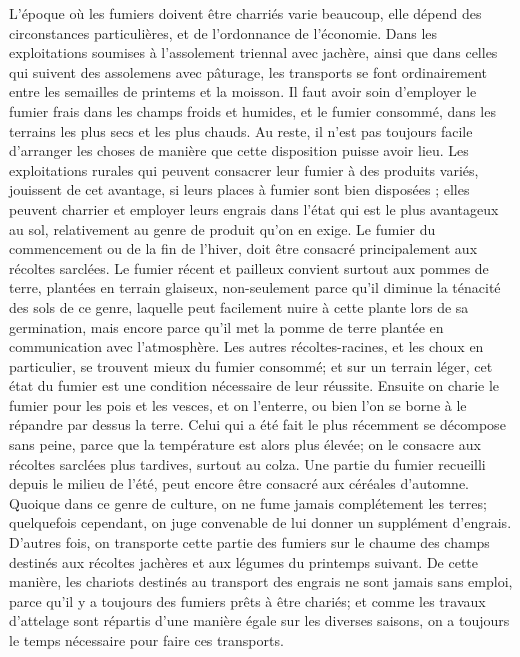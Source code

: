 L'époque où les fumiers doivent être charriés varie beaucoup, elle dépend des circonstances particulières, et de l'ordonnance de l'économie. Dans les exploitations soumises à l'assolement triennal avec jachère, ainsi que dans celles qui suivent des assolemens avec pâturage, les transports se font ordinairement entre les semailles de printems et la moisson. Il faut avoir soin d'employer le fumier frais dans les champs froids et humides, et le fumier consommé, dans les terrains les plus secs et les plus chauds. Au reste, il n'est pas toujours facile d'arranger les choses de manière que cette disposition puisse avoir lieu. Les exploitations rurales qui peuvent consacrer leur fumier à des produits variés, jouissent de cet avantage, si leurs places à fumier sont bien disposées ; elles peuvent charrier et employer leurs engrais dans l'état qui est le plus avantageux\setcounter{page}{39} au sol, relativement au genre de produit qu'on en exige. Le fumier du commencement ou de la fin de l'hiver, doit être consacré principalement aux récoltes sarclées. Le fumier récent et pailleux convient surtout aux pommes de terre, plantées en terrain glaiseux, non-seulement parce qu'il diminue la ténacité des sols de ce genre, laquelle peut facilement nuire à cette plante lors de sa germination, mais encore parce qu'il met la pomme de terre plantée en communication avec l'atmosphère. Les autres récoltes-racines, et les choux en particulier, se trouvent mieux du fumier consommé; et sur un terrain léger, cet état du fumier est une condition nécessaire de leur réussite. Ensuite on charie le fumier pour les pois et les vesces, et on l'enterre, ou bien l'on se borne à le répandre par dessus la terre. Celui qui a été fait le plus récemment se décompose sans peine, parce que la température est alors plus élevée; on le consacre aux récoltes sarclées plus tardives, surtout au colza. Une partie du fumier recueilli depuis le milieu de l'été, peut encore être consacré aux céréales d'automne. Quoique dans ce genre de culture, on ne fume jamais complétement les terres; quelquefois cependant, on juge convenable de lui donner\setcounter{page}{40} un supplément d’engrais. D’autres fois, on transporte cette partie des fumiers sur le chaume des champs destinés aux récoltes jachères et aux légumes du printemps suivant.
De cette manière, les chariots destinés au transport des engrais ne sont jamais sans emploi, parce qu’il y a toujours des fumiers prêts à être chariés; et comme les travaux d’attelage sont répartis d’une manière égale sur les diverses saisons, on a toujours le temps nécessaire pour faire ces transports.
